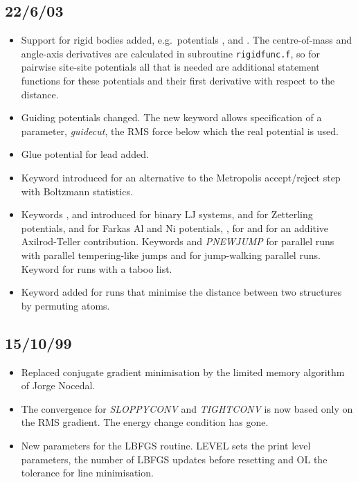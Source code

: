 \subsection{22/6/03}
\begin{itemize}
\item Support for rigid bodies added, e.g.~potentials {\/}, {\/} and {\/}.
The centre-of-mass and angle-axis derivatives are calculated in subroutine {\tt rigidfunc.f}, so for pairwise
site-site potentials all that is needed are additional statement functions for these potentials and their
first derivative with respect to the distance.
\item Guiding potentials changed. The new keyword {\/} allows specification of a parameter,
{\it guidecut\/}, the RMS force below which the real potential is used. 
\item Glue potential for lead added.
\item Keyword {\/} introduced for an alternative to the Metropolis
accept/reject step with Boltzmann statistics.
\item Keywords {\/}, {\/} and {\/} introduced for binary LJ systems,
{\/} and {\/} for Zetterling potentials, {\/} and {\/} for Farkas Al and Ni
potentials, {\/}, {\/} for {\/} and 
{\/} for an additive Axilrod-Teller contribution.
Keywords {\/} and {\it PNEWJUMP\/} for parallel runs with parallel tempering-like jumps
and {\/} for jump-walking parallel runs.
Keyword {\/} for runs with a taboo list.
\item Keyword {\/} added for runs that minimise the distance between two structures by permuting
atoms.

\end{itemize}

\subsection{15/10/99}
\begin{itemize}
\item Replaced conjugate gradient minimisation by the limited memory algorithm
      of Jorge Nocedal\cite{lbfgs}.
\item The convergence for {\it SLOPPYCONV\/} and {\it TIGHTCONV\/} is now
      based only on the RMS gradient. The energy change condition has gone.
\item New parameters for the LBFGS routine. {LEVEL\/} sets the 
      print level parameters, {\/} the number of LBFGS updates
      before resetting and {OL\/} the tolerance for line minimisation.
\end{itemize}


